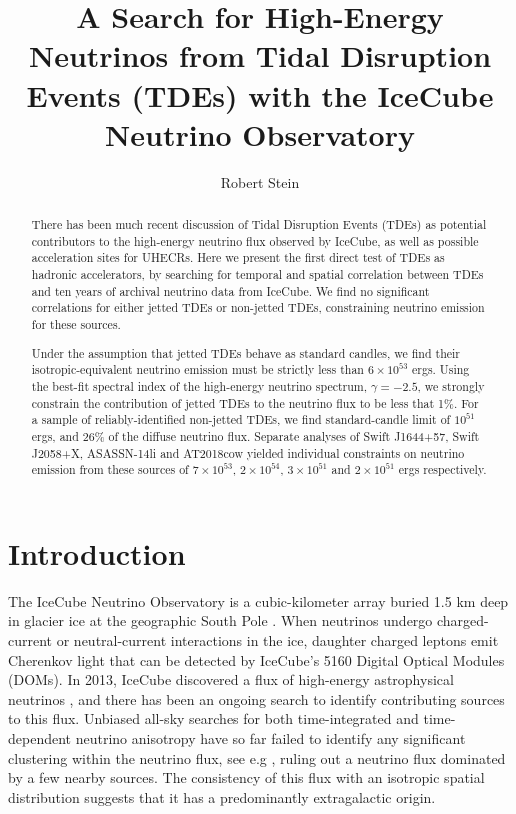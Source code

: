 \documentclass[twocolumn, tighten, linenumbers]{aastex62}
\begin{document}
\title{A Search for High-Energy Neutrinos from Tidal Disruption Events (TDEs) with the IceCube Neutrino Observatory}

\author{Robert Stein}

\begin{abstract}
There has been much recent discussion of Tidal Disruption Events (TDEs) as potential contributors to the high-energy neutrino flux observed by IceCube, as well as possible acceleration sites for UHECRs. Here we present the first direct test of TDEs as hadronic accelerators, by searching for temporal and spatial correlation between TDEs and ten years of archival neutrino data from IceCube. We find no significant correlations for either jetted TDEs or non-jetted TDEs, constraining neutrino emission for these sources. 

Under the assumption that jetted TDEs behave as standard candles, we find their isotropic-equivalent neutrino emission must be strictly less than $6 \times 10^{53} $ ergs.  Using the best-fit spectral index of the high-energy neutrino spectrum, $\gamma=-2.5$, we strongly constrain the contribution of jetted TDEs to the neutrino flux to be less that 1\%.  For a sample of reliably-identified non-jetted TDEs, we find standard-candle limit of $10^{51} $ ergs, and 26\% of the diffuse neutrino flux. Separate analyses of Swift J1644+57, Swift J2058+X, ASASSN-14li and AT2018cow yielded individual constraints on neutrino emission from these sources of $7 \times 10^{53} $, $2 \times 10^{54} $,  $3 \times 10^{51} $ and $2 \times 10^{51} $ ergs respectively.
\end{abstract}


\section{Introduction} 
\label{sec:introduction}
The IceCube Neutrino Observatory is a cubic-kilometer array buried 1.5 km deep in glacier ice at the geographic South Pole \cite{Aartsen:2016nxy}. When neutrinos undergo charged-current  or neutral-current interactions in the ice, daughter charged leptons emit Cherenkov light that can be detected by IceCube's 5160 Digital Optical Modules (DOMs). In 2013, IceCube discovered a flux of high-energy astrophysical neutrinos \citep{Aartsen:2015knd, Aartsen:2013jdh}, and there has been an ongoing search to identify contributing sources to this flux. Unbiased all-sky searches for both time-integrated and time-dependent neutrino anisotropy have so far failed to identify any significant clustering within the neutrino flux, see e.g  \citep{Aartsen:2016oji}, ruling out a neutrino flux dominated by a few nearby sources. The consistency of this flux with an isotropic spatial distribution suggests that it has a predominantly extragalactic origin.
\end{document}
